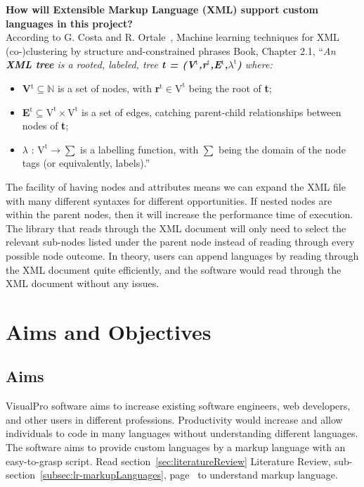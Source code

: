 \documentclass[conference]{IEEEtran}
\begin{document}
        \textbf{How will Extensible Markup Language (XML) support custom languages in this project?}\\
          According to G. Costa and R. Ortale~\cite{costa_machine_2018}, Machine learning techniques for XML (co-)clustering by structure and-constrained phrases Book, Chapter 2.1, ``\textit{An \textbf{XML tree} is a rooted, labeled, tree \textbf{t = (V$^{\text{t}}$,r$^{\text{t}}$,E$^{\text{t}}$,$\lambda^{\text{t}}$)} where:}
          \begin{itemize}
            \item \textbf{V$^{\text{t}} \subseteq \mathbb{N}$} is a set of nodes, with \textbf{r$^{\text{t}} \in \text{V}^{\text{t}}$} being the root of \textbf{t};
            \item \textbf{E$^{\text{t}} \subseteq \text{V}^{\text{t}} \times \text{V}^{\text{t}}$} is a set of edges, catching parent-child relationships between nodes of \textbf{t};
            \item \textbf{$\lambda \text{ : V}^{\text{t}} \rightarrow \sum $} is a labelling function, with $\sum$ being the domain of the node tags (or equivalently, labels).''
          \end{itemize}

          The facility of having nodes and attributes means we can expand the XML file with many different syntaxes for different opportunities. If nested nodes are within the parent nodes, then it will increase the performance time of execution. The library that reads through the XML document will only need to select the relevant sub-nodes listed under the parent node instead of reading through every possible node outcome. In theory, users can append languages by reading through the XML document quite efficiently, and the software would read through the XML document without any issues.

    \section{Aims and Objectives}
      \subsection{Aims}
        VisualPro software aims to increase existing software engineers, web developers, and other users in different professions. Productivity would increase and allow individuals to code in many languages without understanding different languages. The software aims to provide custom languages by a markup language with an easy-to-grasp script. Read section~\ref{sec:literatureReview} Literature Review, sub-section~\ref{subsec:lr-markupLanguages}, page~\pageref{subsec:lr-markupLanguages} to understand markup language.
\end{document}

